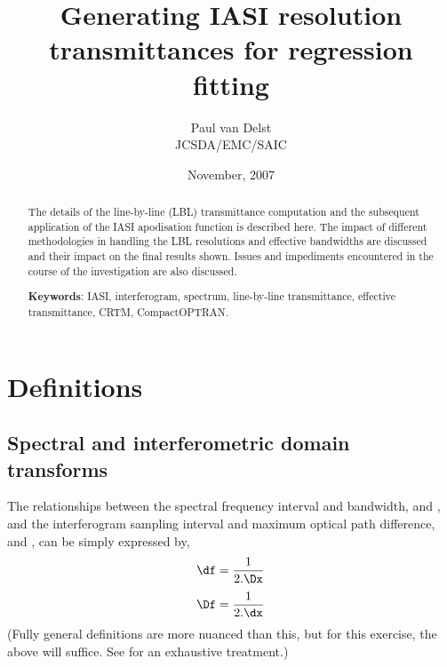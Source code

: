 



\title{Generating IASI resolution transmittances for regression fitting}
\author{Paul van Delst\\JCSDA/EMC/SAIC}
\date{November, 2007}



\maketitle

\begin{abstract}
The details of the line-by-line (LBL) transmittance computation and the subsequent application of the IASI apodisation function is described here. The impact of different methodologies in handling the LBL resolutions and effective bandwidths are discussed and their impact on the final results shown. Issues and impediments encountered in the course of the investigation are also discussed.

\textbf{Keywords}: IASI, interferogram, spectrum, line-by-line transmittance, effective transmittance, CRTM, CompactOPTRAN.
\end{abstract}


\section{Definitions}

\subsection{Spectral and interferometric domain transforms}
The relationships between the spectral frequency interval and bandwidth, {\df} and {\Df}, and the interferogram sampling interval and maximum optical path difference, {\dx} and {\Dx}, can be simply expressed by,
\begin{equation}\df = \frac{1}{2.\Dx}\label{eqn:df_deltax}\end{equation}
\begin{equation}\Df = \frac{1}{2.\dx}\label{eqn:deltaf_dx}\end{equation}
(Fully general definitions are more nuanced than this, but for this exercise, the above will suffice. See \cite{Bell1972} for an exhaustive treatment.)


